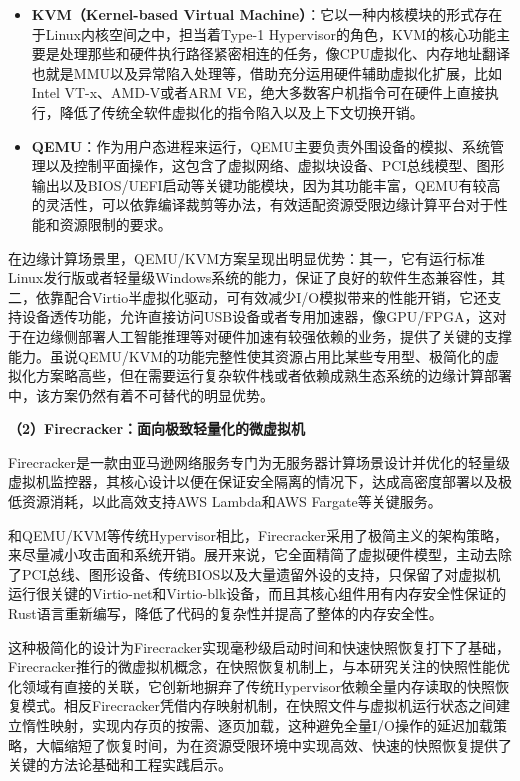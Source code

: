 \begin{itemize}

\item \textbf{KVM（Kernel-based Virtual Machine）\cite{kivity2007kvm}}：它以一种内核模块的形式存在于Linux内核空间之中，担当着Type-1 Hypervisor的角色，KVM的核心功能主要是处理那些和硬件执行路径紧密相连的任务，像CPU虚拟化、内存地址翻译也就是MMU以及异常陷入处理等，借助充分运用硬件辅助虚拟化扩展，比如Intel VT-x、AMD-V或者ARM VE，绝大多数客户机指令可在硬件上直接执行，降低了传统全软件虚拟化的指令陷入以及上下文切换开销。

\item \textbf{QEMU\cite{bellard2005qemu}}：作为用户态进程来运行，QEMU主要负责外围设备的模拟、系统管理以及控制平面操作，这包含了虚拟网络、虚拟块设备、PCI总线模型、图形输出以及BIOS/UEFI启动等关键功能模块，因为其功能丰富，QEMU有较高的灵活性，可以依靠编译裁剪等办法，有效适配资源受限边缘计算平台对于性能和资源限制的要求。

\end{itemize}

在边缘计算场景里，QEMU/KVM方案呈现出明显优势：其一，它有运行标准Linux发行版或者轻量级Windows系统的能力，保证了良好的软件生态兼容性，其二，依靠配合Virtio半虚拟化驱动，可有效减少I/O模拟带来的性能开销，它还支持设备透传功能，允许直接访问USB设备或者专用加速器，像GPU/FPGA，这对于在边缘侧部署人工智能推理等对硬件加速有较强依赖的业务，提供了关键的支撑能力。虽说QEMU/KVM的功能完整性使其资源占用比某些专用型、极简化的虚拟化方案略高些，但在需要运行复杂软件栈或者依赖成熟生态系统的边缘计算部署中，该方案仍然有着不可替代的明显优势。

\textbf{（2）Firecracker：面向极致轻量化的微虚拟机}

Firecracker是一款由亚马逊网络服务专门为无服务器计算场景设计并优化的轻量级虚拟机监控器\cite{agache2020firecracker}，其核心设计以便在保证安全隔离的情况下，达成高密度部署以及极低资源消耗，以此高效支持AWS Lambda和AWS Fargate等关键服务\cite{aws_firecracker_blog}。

和QEMU/KVM等传统Hypervisor相比，Firecracker采用了极简主义的架构策略，来尽量减小攻击面和系统开销\cite{kivity2007kvm}。展开来说，它全面精简了虚拟硬件模型，主动去除了PCI总线、图形设备、传统BIOS以及大量遗留外设的支持，只保留了对虚拟机运行很关键的Virtio-net和Virtio-blk设备，而且其核心组件用有内存安全性保证的Rust语言重新编写，降低了代码的复杂性并提高了整体的内存安全性\cite{agache2020firecracker}。

这种极简化的设计为Firecracker实现毫秒级启动时间和快速快照恢复打下了基础\cite{agache2020firecracker}，Firecracker推行的微虚拟机概念，在快照恢复机制上，与本研究关注的快照性能优化领域有直接的关联，它创新地摒弃了传统Hypervisor依赖全量内存读取的快照恢复模式。相反Firecracker凭借内存映射机制，在快照文件与虚拟机运行状态之间建立惰性映射，实现内存页的按需、逐页加载，这种避免全量I/O操作的延迟加载策略\cite{firecracker_snapshot}，大幅缩短了恢复时间，为在资源受限环境中实现高效、快速的快照恢复提供了关键的方法论基础和工程实践启示。

